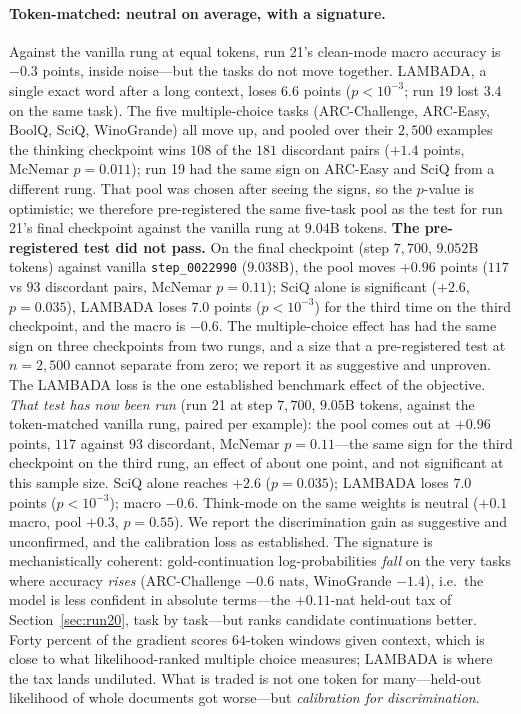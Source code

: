 \documentclass{article} %
\begin{document}
\paragraph{Token-matched: neutral on average, with a signature.} Against the vanilla rung at equal tokens, run 21's clean-mode macro accuracy is $-0.3$ points, inside noise---but the tasks do not move together. LAMBADA, a single exact word after a long context, loses $6.6$ points ($p < 10^{-3}$; run 19 lost $3.4$ on the same task). The five multiple-choice tasks (ARC-Challenge, ARC-Easy, BoolQ, SciQ, WinoGrande) all move up, and pooled over their $2{,}500$ examples the thinking checkpoint wins $108$ of the $181$ discordant pairs ($+1.4$ points, McNemar $p = 0.011$); run 19 had the same sign on ARC-Easy and SciQ from a different rung. That pool was chosen after seeing the signs, so the $p$-value is optimistic; we therefore pre-registered the same five-task pool as the test for run 21's final checkpoint against the vanilla rung at $9.04$B tokens. \textbf{The pre-registered test did not pass.} On the final checkpoint (step $7{,}700$, $9.052$B tokens) against vanilla \texttt{step\_0022990} ($9.038$B), the pool moves $+0.96$ points ($117$ vs $93$ discordant pairs, McNemar $p = 0.11$); SciQ alone is significant ($+2.6$, $p = 0.035$), LAMBADA loses $7.0$ points ($p < 10^{-3}$) for the third time on the third checkpoint, and the macro is $-0.6$. The multiple-choice effect has had the same sign on three checkpoints from two rungs, and a size that a pre-registered test at $n = 2{,}500$ cannot separate from zero; we report it as suggestive and unproven. The LAMBADA loss is the one established benchmark effect of the objective. \emph{That test has now been run} (run 21 at step $7{,}700$, $9.05$B tokens, against the token-matched vanilla rung, paired per example): the pool comes out at $+0.96$ points, $117$ against $93$ discordant, McNemar $p = 0.11$---the same sign for the third checkpoint on the third rung, an effect of about one point, and not significant at this sample size. SciQ alone reaches $+2.6$ ($p = 0.035$); LAMBADA loses $7.0$ points ($p < 10^{-3}$); macro $-0.6$. Think-mode on the same weights is neutral ($+0.1$ macro, pool $+0.3$, $p = 0.55$). We report the discrimination gain as suggestive and unconfirmed, and the calibration loss as established. The signature is mechanistically coherent: gold-continuation log-probabilities \emph{fall} on the very tasks where accuracy \emph{rises} (ARC-Challenge $-0.6$ nats, WinoGrande $-1.4$), i.e.\ the model is less confident in absolute terms---the $+0.11$-nat held-out tax of Section~\ref{sec:run20}, task by task---but ranks candidate continuations better. Forty percent of the gradient scores $64$-token windows given context, which is close to what likelihood-ranked multiple choice measures; LAMBADA is where the tax lands undiluted. What is traded is not one token for many---held-out likelihood of whole documents got worse---but \emph{calibration for discrimination}.
\end{document}
